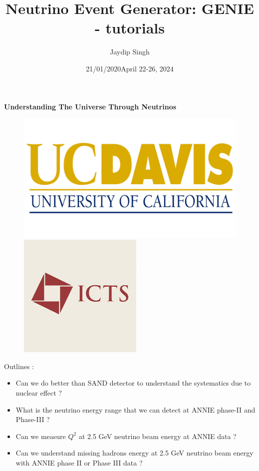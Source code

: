 \documentclass[9pt]{beamer}    %
\title[UCDavis]{Neutrino Event Generator:  GENIE - tutorials}
\author{Jaydip Singh}
\institute[] %
{%
 Postdoc at Department of Physics and Astronomy, UC Davis\\

}\date{21/01/2020}
\date[]{April 22-26, 2024}
\begin{document}
\begin{frame}
  \titlepage\centering\textbf{ Understanding The Universe Through Neutrinos} \\
  \begin{figure}[!htb]
   \begin{minipage}{0.30\textwidth}
     \centering
     \includegraphics[width=.60\linewidth]{UC-Davis-Logo.png}
     
   \end{minipage}\hfill
   \begin{minipage}{0.30\textwidth}
     \centering
     \includegraphics[width=.45\linewidth]{icts_logo.jpeg}
    
   \end{minipage}
\end{figure}
\end{frame}


\begin{frame}{Outlines : }
\begin{itemize}
 \item Can we do better than SAND detector to understand the systematics due to nuclear effect ?

 \item What is the neutrino energy range that we can detect at ANNIE phase-II and Phase-III ?

 \item Can we measure $Q^{2}$ at 2.5 GeV neutrino beam energy at ANNIE data ?

 \item Can we understand missing hadrons energy at 2.5 GeV neutrino beam energy with ANNIE phase II or Phase III data ?

\end{itemize}

\end{frame}
\end{document}
